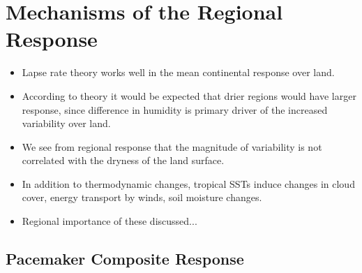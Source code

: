
\section{Mechanisms of the Regional Response}

\begin{itemize}
	\item Lapse rate theory works well in the mean continental response over 
		land.
	\item According to theory it would be expected that drier regions would have 
		larger response, since difference in humidity is primary driver of the 
		increased variability over land.
	\item We see from regional response that the magnitude of variability is not 
		correlated with the dryness of the land surface.
	\item In addition to thermodynamic changes, tropical SSTs induce changes in 
		cloud cover, energy transport by winds, soil moisture changes.
	\item Regional importance of these discussed...
\end{itemize}

\newpage

\subsection{Pacemaker Composite Response}

